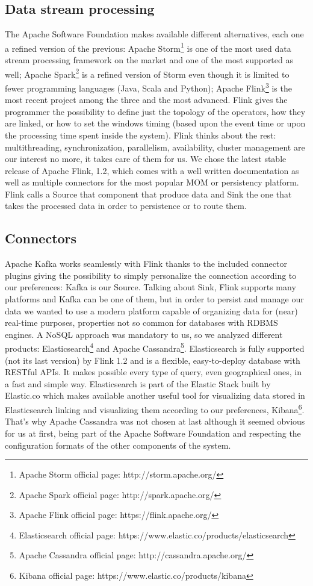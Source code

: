 \subsection{Data stream processing}
The Apache Software Foundation makes available different alternatives, each one a refined version of the previous: Apache Storm\footnote{Apache Storm official page: http://storm.apache.org/} is one of the most used data stream processing framework on the market and one of the most supported as well; Apache Spark\footnote{Apache Spark official page: http://spark.apache.org/} is a refined version of Storm even though it is limited to fewer programming languages (Java, Scala and Python); Apache Flink\footnote{Apache Flink official page: https://flink.apache.org/} is the most recent project among the three and the most advanced. Flink gives the programmer the possibility to define just the topology of the operators, how they are linked, or how to set the windows timing (based upon the event time or upon the processing time spent inside the system). Flink thinks about the rest: multithreading, synchronization, parallelism, availability, cluster management are our interest no more, it takes care of them for us. We chose the latest stable release of Apache Flink, 1.2, which comes with a well written documentation as well as multiple connectors for the most popular MOM or persistency platform. Flink calls a Source that component that produce data and Sink the one that takes the processed data in order to persistence or to route them. 

\subsection{Connectors}
Apache Kafka works seamlessly with Flink thanks to the included connector plugins giving the possibility to simply personalize the connection according to our preferences: Kafka is our Source. Talking about Sink, Flink supports many platforms and Kafka can be one of them, but in order to persist and manage our data we wanted to use a modern platform capable of organizing data for (near) real-time purposes, properties not so common for databases with RDBMS engines. A NoSQL approach was mandatory to us, so we analyzed different products: Elasticsearch\footnote{Elasticsearch official page: https://www.elastic.co/products/elasticsearch} and Apache Cassandra\footnote{Apache Cassandra official page: http://cassandra.apache.org/}. Elasticsearch is fully supported (not its last version) by Flink 1.2 and is a flexible, easy-to-deploy database with RESTful APIs. It makes possible every type of query, even geographical ones, in a fast and simple way. Elasticsearch is part of the Elastic Stack built by Elastic.co which makes available another useful tool for visualizing data stored in Elasticsearch linking and visualizing them according to our preferences, Kibana\footnote{Kibana official page: https://www.elastic.co/products/kibana}. That's why Apache Cassandra was not chosen at last although it seemed obvious for us at first, being part of the Apache Software Foundation and respecting the configuration formats of the other components of the system.

